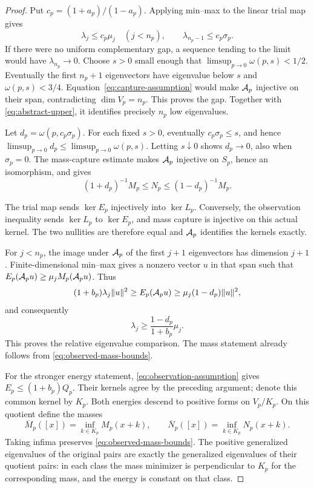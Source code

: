 \begin{proof}
Put $c_p=(1+a_p)/(1-a_p)$. Applying min--max to the linear trial
map gives
\begin{equation}\label{eq:abstract-upper}
 \lambda_j\le c_p\mu_j\quad(j<n_p),\qquad
 \lambda_{n_p-1}\le c_p\sigma_p.
\end{equation}
If there were no uniform complementary gap, a sequence tending to the
limit would have $\lambda_{n_p}\to0$. Choose $s>0$ small enough that
$\limsup_{p\to0}\omega(p,s)<1/2$. Eventually the first $n_p+1$
eigenvectors have eigenvalue below $s$ and $\omega(p,s)<3/4$.
Equation~\eqref{eq:capture-assumption} would make $\mathcal A_p$ injective
on their span, contradicting $\dim V_p=n_p$. This proves the gap.
Together with \eqref{eq:abstract-upper}, it identifies precisely
$n_p$ low eigenvalues.

Let $d_p=\omega(p,c_p\sigma_p)$. For each fixed $s>0$, eventually
$c_p\sigma_p\le s$, and hence
$\limsup_{p\to0}d_p\le\limsup_{p\to0}\omega(p,s)$. Letting $s\downarrow0$
shows $d_p\to0$, also when $\sigma_p=0$. The mass-capture estimate
makes $\mathcal A_p$ injective on $S_p$, hence an isomorphism, and gives
\begin{equation}\label{eq:observed-mass-bounds}
 (1+d_p)^{-1}M_p\le N_p\le(1-d_p)^{-1}M_p.
\end{equation}

The trial map sends $\ker E_p$ injectively into $\ker L_p$. Conversely,
the observation inequality sends $\ker L_p$ to $\ker E_p$, and
mass capture is injective on this actual kernel. The two nullities
are therefore equal and $\mathcal A_p$ identifies the kernels exactly.

For $j<n_p$, the image under $\mathcal A_p$ of the first $j+1$ eigenvectors
has dimension $j+1$. Finite-dimensional min--max gives a nonzero
vector $u$ in that span such that
$E_p(\mathcal A_pu)\ge\mu_jM_p(\mathcal A_pu)$. Thus
\[
 (1+b_p)\lambda_j\|u\|^2
       \ge E_p(\mathcal A_pu)
       \ge\mu_j(1-d_p)\|u\|^2,
\]
and consequently
\begin{equation}\label{eq:abstract-lower}
 \lambda_j\ge\frac{1-d_p}{1+b_p}\mu_j.
\end{equation}
This proves the relative eigenvalue comparison. The mass statement
already follows from \eqref{eq:observed-mass-bounds}.

For the stronger energy statement,
\eqref{eq:observation-assumption} gives
$E_p\le(1+b_p)Q_p$. Their kernels agree by the preceding argument;
denote this common kernel by $K_p$. Both energies descend to positive
forms on $V_p/K_p$. On this quotient define the masses
\begin{equation}\label{eq:quotient-masses}
 \overline M_p([x])=\inf_{k\in K_p}M_p(x+k),\qquad
 \overline N_p([x])=\inf_{k\in K_p}N_p(x+k).
\end{equation}
Taking infima preserves \eqref{eq:observed-mass-bounds}. The positive
generalized eigenvalues of the original pairs are exactly the
generalized eigenvalues of their quotient pairs: in each class the
mass minimizer is perpendicular to $K_p$ for the corresponding mass,
and the energy is constant on that class.


\end{proof}

